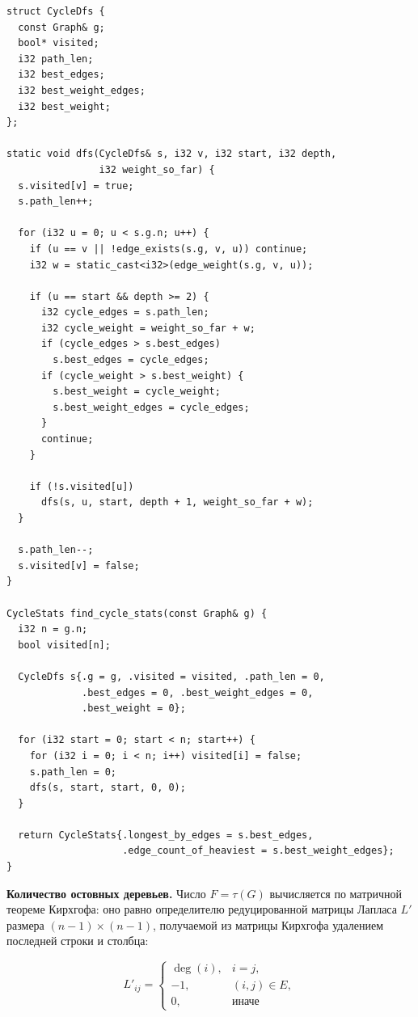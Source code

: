 \documentclass[14pt]{extarticle}
\begin{document}
\begin{listing}[htbp]
\caption{Поиск максимального цикла}
\begin{verbatim}
struct CycleDfs {
  const Graph& g;
  bool* visited;
  i32 path_len;
  i32 best_edges;
  i32 best_weight_edges;
  i32 best_weight;
};

static void dfs(CycleDfs& s, i32 v, i32 start, i32 depth,
                i32 weight_so_far) {
  s.visited[v] = true;
  s.path_len++;

  for (i32 u = 0; u < s.g.n; u++) {
    if (u == v || !edge_exists(s.g, v, u)) continue;
    i32 w = static_cast<i32>(edge_weight(s.g, v, u));

    if (u == start && depth >= 2) {
      i32 cycle_edges = s.path_len;
      i32 cycle_weight = weight_so_far + w;
      if (cycle_edges > s.best_edges)
        s.best_edges = cycle_edges;
      if (cycle_weight > s.best_weight) {
        s.best_weight = cycle_weight;
        s.best_weight_edges = cycle_edges;
      }
      continue;
    }

    if (!s.visited[u])
      dfs(s, u, start, depth + 1, weight_so_far + w);
  }

  s.path_len--;
  s.visited[v] = false;
}

CycleStats find_cycle_stats(const Graph& g) {
  i32 n = g.n;
  bool visited[n];

  CycleDfs s{.g = g, .visited = visited, .path_len = 0,
             .best_edges = 0, .best_weight_edges = 0,
             .best_weight = 0};

  for (i32 start = 0; start < n; start++) {
    for (i32 i = 0; i < n; i++) visited[i] = false;
    s.path_len = 0;
    dfs(s, start, start, 0, 0);
  }

  return CycleStats{.longest_by_edges = s.best_edges,
                    .edge_count_of_heaviest = s.best_weight_edges};
}
\end{verbatim}
\end{listing}

\textbf{Количество остовных деревьев.} Число \(F = \tau(G)\) вычисляется по матричной теореме Кирхгофа: оно равно определителю редуцированной матрицы Лапласа \(L'\) размера \((n-1) \times (n-1)\), получаемой из матрицы Кирхгофа удалением последней строки и столбца:

$$L'_{ij} = \begin{cases} \deg(i), & i = j, \\ -1, & (i,j) \in E, \\ 0, & \text{иначе} \end{cases}$$
\end{document}
